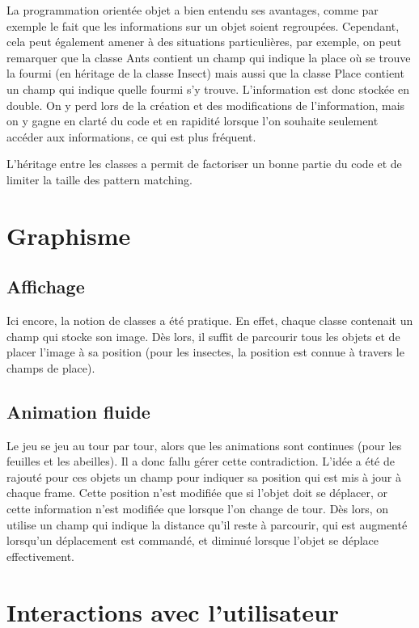 \documentclass[10pt,a4paper]{article}
\begin{document}
La programmation orientée objet a bien entendu ses avantages, comme par exemple le fait que les informations sur un objet soient regroupées. Cependant, cela peut également amener à des situations particulières, par exemple, on peut remarquer que la classe Ants contient un champ qui indique la place où se trouve la fourmi (en héritage de la classe Insect) mais aussi que la classe Place contient un champ qui indique quelle fourmi s'y trouve. L'information est donc stockée en double. On y perd lors de la création et des modifications de l'information, mais on y gagne en clarté du code et en rapidité lorsque l'on souhaite seulement accéder aux informations, ce qui est plus fréquent.

L'héritage entre les classes a permit de factoriser un bonne partie du code et de limiter la taille des pattern matching.

\section{Graphisme}

\subsection{Affichage}

Ici encore, la notion de classes a été pratique. En effet, chaque classe contenait un champ qui stocke son image. Dès lors, il suffit de parcourir tous les objets et de placer l'image à sa position (pour les insectes, la position est connue à travers le champs de place). 

\subsection{Animation fluide}
  
Le jeu se jeu au tour par tour, alors que les animations sont continues (pour les feuilles et les abeilles). Il a donc fallu gérer cette contradiction. L'idée a été de rajouté pour ces objets un champ pour indiquer sa position qui est mis à jour à chaque frame. Cette position n'est modifiée que si l'objet doit se déplacer, or cette information n'est modifiée que lorsque l'on change de tour. Dès lors, on utilise un champ qui indique la distance qu'il reste à parcourir, qui est augmenté lorsqu'un déplacement est commandé, et diminué lorsque l'objet se déplace effectivement.

\section{Interactions avec l'utilisateur}
\end{document}
